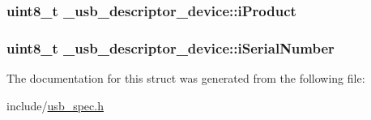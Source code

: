 \hypertarget{struct__usb__descriptor__device_a1edb8eb3bf1bfe19a9125a1b94c03e2e}{
\subsubsection[{i\-Product}]{\setlength{\rightskip}{0pt plus 5cm}uint8\-\_\-t \-\_\-usb\-\_\-descriptor\-\_\-device\-::i\-Product}}\label{struct__usb__descriptor__device_a1edb8eb3bf1bfe19a9125a1b94c03e2e}
\hypertarget{struct__usb__descriptor__device_acc5f539a5344be6787f56cbebc3b910f}{
\subsubsection[{i\-Serial\-Number}]{\setlength{\rightskip}{0pt plus 5cm}uint8\-\_\-t \-\_\-usb\-\_\-descriptor\-\_\-device\-::i\-Serial\-Number}}\label{struct__usb__descriptor__device_acc5f539a5344be6787f56cbebc3b910f}


The documentation for this struct was generated from the following file\-:\begin{DoxyCompactItemize}
\item 
include/\hyperlink{usb__spec_8h}{usb\-\_\-spec.\-h}\end{DoxyCompactItemize}
